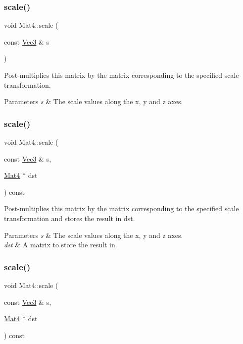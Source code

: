 \subsubsection{\texorpdfstring{scale()}{scale()}\hspace{0.1cm}{\footnotesize\ttfamily [10/12]}}
{\footnotesize\ttfamily void Mat4\+::scale (\begin{DoxyParamCaption}\item[{const \hyperlink{classVec3}{Vec3} \&}]{s }\end{DoxyParamCaption})}

Post-\/multiplies this matrix by the matrix corresponding to the specified scale transformation.


\begin{DoxyParams}{Parameters}
{\em s} & The scale values along the x, y and z axes. \\
\hline
\end{DoxyParams}
\mbox{\label{classMat4_aca9dcebbcb554ea36fc86ac1127a3fd4}} 
\subsubsection{\texorpdfstring{scale()}{scale()}\hspace{0.1cm}{\footnotesize\ttfamily [11/12]}}
{\footnotesize\ttfamily void Mat4\+::scale (\begin{DoxyParamCaption}\item[{const \hyperlink{classVec3}{Vec3} \&}]{s,  }\item[{\hyperlink{classMat4}{Mat4} $\ast$}]{dst }\end{DoxyParamCaption}) const}

Post-\/multiplies this matrix by the matrix corresponding to the specified scale transformation and stores the result in dst.


\begin{DoxyParams}{Parameters}
{\em s} & The scale values along the x, y and z axes. \\
\hline
{\em dst} & A matrix to store the result in. \\
\hline
\end{DoxyParams}
\mbox{\label{classMat4_aca9dcebbcb554ea36fc86ac1127a3fd4}} 
\subsubsection{\texorpdfstring{scale()}{scale()}\hspace{0.1cm}{\footnotesize\ttfamily [12/12]}}
{\footnotesize\ttfamily void Mat4\+::scale (\begin{DoxyParamCaption}\item[{const \hyperlink{classVec3}{Vec3} \&}]{s,  }\item[{\hyperlink{classMat4}{Mat4} $\ast$}]{dst }\end{DoxyParamCaption}) const}

